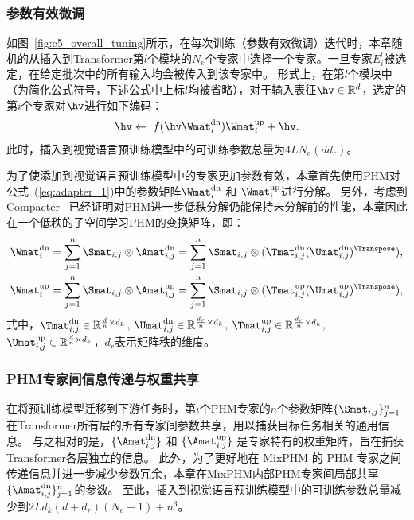 \subsubsection{参数有效微调}
如图~\ref{fig:c5_overall_tuning}所示，在每次训练（参数有效微调）迭代时，本章随机的从插入到Transformer第$l$个模块的$N_e$个专家中选择一个专家。一旦专家$E_i^l$被选定，在给定批次中的所有输入均会被传入到该专家中。
形式上，在第$l$个模块中（为简化公式符号，下述公式中上标$l$均被省略），对于输入表征$\hv \in \mathbb{R}^d$，选定的第$i$个专家对$\hv$进行如下编码：
\begin{equation} 
\begin{aligned} 
\hv \leftarrow ~f(\hv \Wmat_i^{\text{dn}})\Wmat_i^{\text{up}} + \hv. 
\end{aligned}
\label{eq:adapter_1} 
\end{equation}
此时，插入到视觉语言预训练模型中的可训练参数总量为$4LN_e(dd_r)$。


为了使添加到视觉语言预训练模型中的专家更加参数有效，本章首先使用PHM对公式~(\ref{eq:adapter_1})中的参数矩阵$\Wmat_i^{\text{dn}}$ 和 $\Wmat_i^{\text{up}}$进行分解。
另外，考虑到Compacter~\cite{karimi2021compacter} 已经证明对PHM进一步低秩分解仍能保持未分解前的性能，本章因此在一个低秩的子空间学习PHM的变换矩阵，即：
\begin{align} 
&\Wmat_i^{\text{dn}} = \sum_{j=1}^{n} \Smat_{i,j} \otimes \Amat_{i,j}^{\text{dn}}
= \sum_{j=1}^{n} \Smat_{i,j} \otimes (\Tmat_{i,j}^{\text{dn}} (\Umat_{i,j}^{\text{dn}})^{\Transpose})
, \\
&\Wmat_i^{\text{up}} = \sum_{j=1}^{n} \Smat_{i,j} \otimes \Amat_{i,j}^{\text{up}}
= \sum_{j=1}^{n} \Smat_{i,j} \otimes (\Tmat_{i,j}^{\text{up}} (\Umat_{i,j}^{\text{up}})^{\Transpose})
, 
\label{eq:ada_phm}
\end{align}
式中，$\Tmat_{i,j}^{\text{dn}} \in \mathbb{R}^{\frac{d}{n}\times d_k}$, $\Umat_{i,j}^{\text{dn}} \in \mathbb{R}^{\frac{d_r}{n}\times d_k}$, $\Tmat_{i,j}^{\text{up}} \in \mathbb{R}^{\frac{d_r}{n}\times d_k}$, $\Umat_{i,j}^{\text{up}} \in \mathbb{R}^{\frac{d}{n}\times d_k}$，$d_r$表示矩阵秩的维度。


\subsubsection{PHM专家间信息传递与权重共享}
在将预训练模型迁移到下游任务时，第$i$个PHM专家的$n$个参数矩阵$\{\Smat_{i,j}\}_{j=1}^n$ 在Transformer所有层的所有专家间参数共享，用以捕获目标任务相关的通用信息。
与之相对的是，$\{\Amat_{i,j}^{\text{dn}}\}$ 和 $\{\Amat_{i,j}^{\text{up}}\}$ 是专家特有的权重矩阵，旨在捕获Transformer各层独立的信息。
此外，为了更好地在 MixPHM 的 PHM 专家之间传递信息并进一步减少参数冗余，本章在MixPHM内部PHM专家间局部共享$\{\Amat_{i,j}^{\text{dn}}\}_{j=1}^n$的参数。
至此，插入到视觉语言预训练模型中的可训练参数总量减少到$2Ld_k(d+d_r)(N_e + 1) + n^3$。




